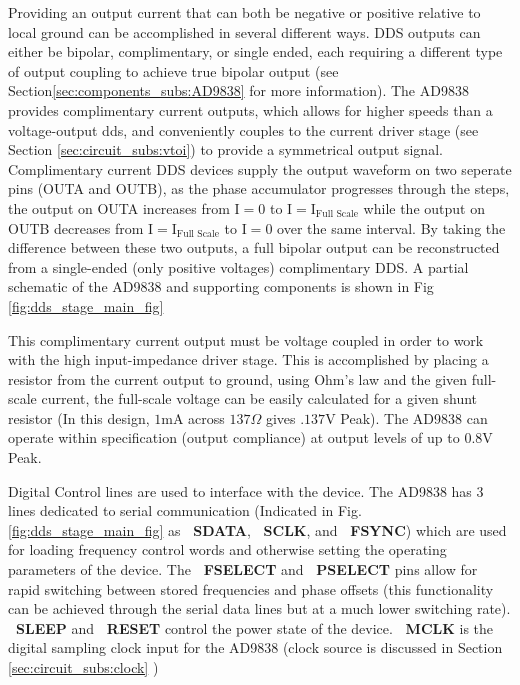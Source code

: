 Providing an output current that can both be negative or positive relative to local ground can be accomplished in several different ways. DDS outputs can either be bipolar, complimentary, or single ended, each requiring a different type of output coupling to achieve true bipolar output (see Section\ref{sec:components_subs:AD9838} for more information). The AD9838 provides complimentary current outputs, which allows for higher speeds than a voltage-output dds, and conveniently couples to the current driver stage (see Section \ref{sec:circuit_subs:vtoi}) to provide a symmetrical output signal. Complimentary current DDS devices supply the output waveform on two seperate pins (OUTA and OUTB), as the phase accumulator progresses through the steps, the output on OUTA increases from I$=0$ to $\text{I} = \text{I}_\text{Full Scale}$ while the output on OUTB decreases from $\text{I} = \text{I}_\text{Full Scale}$ to $\text{I} = 0$ over the same interval. By taking the difference between these two outputs, a full bipolar output can be reconstructed from a single-ended (only positive voltages) complimentary DDS. A partial schematic of the AD9838 and supporting components is shown in Fig \ref{fig:dds_stage_main_fig}

This complimentary current output must be voltage coupled in order to work with the high input-impedance driver stage. This is accomplished by placing a resistor from the current output to ground, using Ohm's law and the given full-scale current, the full-scale voltage can be easily calculated for a given shunt resistor (In this design, $1\text{mA}$ across $137\Omega$ gives $.137\text{V}$ Peak). The AD9838 can operate within specification (output compliance) at output levels of up to $0.8\text{V}$ Peak.

Digital Control lines are used to interface with the device. The AD9838 has 3 lines dedicated to serial communication (Indicated in Fig. \ref{fig:dds_stage_main_fig} as {\bf~SDATA}, {\bf~SCLK}, and {\bf~FSYNC}) which are used for loading frequency control words and otherwise setting the operating parameters of the device. The {\bf~FSELECT} and {\bf~PSELECT} pins allow for rapid switching between stored frequencies and phase offsets (this functionality can be achieved through the serial data lines but at a much lower switching rate). {\bf~SLEEP} and {\bf~RESET} control the power state of the device. {\bf~MCLK} is the digital sampling clock input for the AD9838 (clock source is discussed in Section \ref{sec:circuit_subs:clock} )

